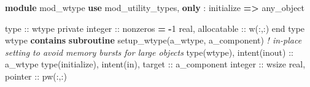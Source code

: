 \documentclass[
  paper=a4,
  ,captions=tableheading
]{scrartcl}
\newenvironment{Shaded}{\begin{snugshade}}{\end{snugshade}}
\newcommand{\CommentTok}[1]{\textcolor[rgb]{0.56,0.35,0.01}{\textit{#1}}}
\newcommand{\DataTypeTok}[1]{\textcolor[rgb]{0.13,0.29,0.53}{#1}}
\newcommand{\DecValTok}[1]{\textcolor[rgb]{0.00,0.00,0.81}{#1}}
\newcommand{\KeywordTok}[1]{\textcolor[rgb]{0.13,0.29,0.53}{\textbf{#1}}}
\newcommand{\NormalTok}[1]{#1}
\newcommand{\OperatorTok}[1]{\textcolor[rgb]{0.81,0.36,0.00}{\textbf{#1}}}
\begin{document}
\begin{Shaded}
\begin{Highlighting}[]
\KeywordTok{module}\NormalTok{ mod\_wtype}
  \KeywordTok{use}\NormalTok{ mod\_utility\_types, }\KeywordTok{only}\NormalTok{ : initialize }\KeywordTok{=}\OperatorTok{\textgreater{}}\NormalTok{ any\_object}

  \DataTypeTok{type} \DataTypeTok{::}\NormalTok{ wtype}
    \DataTypeTok{private}
    \DataTypeTok{integer} \DataTypeTok{::}\NormalTok{ nonzeros }\KeywordTok{=} \KeywordTok{{-}}\DecValTok{1}
    \DataTypeTok{real}\NormalTok{, }\DataTypeTok{allocatable} \DataTypeTok{::}\NormalTok{ w(:,:)}
  \DataTypeTok{end type}\NormalTok{ wtype}
\KeywordTok{contains}
  \KeywordTok{subroutine}\NormalTok{ setup\_wtype(a\_wtype, a\_component)}
    \CommentTok{! in{-}place setting to avoid memory bursts for large objects}
    \DataTypeTok{type(wtype)}\NormalTok{, }\DataTypeTok{intent(inout)} \DataTypeTok{::}\NormalTok{ a\_wtype}
    \DataTypeTok{type(initialize)}\NormalTok{, }\DataTypeTok{intent(in)}\NormalTok{, }\DataTypeTok{target} \DataTypeTok{::}\NormalTok{ a\_component}
    \DataTypeTok{integer} \DataTypeTok{::}\NormalTok{ wsize}
    \DataTypeTok{real}\NormalTok{, }\DataTypeTok{pointer} \DataTypeTok{::}\NormalTok{ pw(:,:)}


\end{Highlighting}
\end{Shaded}
\end{document}
